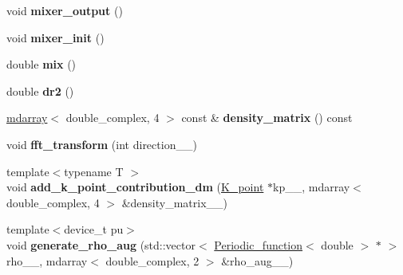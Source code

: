\begin{DoxyCompactItemize}
\item 
\hypertarget{classsirius_1_1_density_aa98f530b6ca5ce2cff733bffb22d589d}{}void {\bfseries mixer\+\_\+output} ()\label{classsirius_1_1_density_aa98f530b6ca5ce2cff733bffb22d589d}

\item 
\hypertarget{classsirius_1_1_density_a3571e02abf5a8bed85dd5d1afa355106}{}void {\bfseries mixer\+\_\+init} ()\label{classsirius_1_1_density_a3571e02abf5a8bed85dd5d1afa355106}

\item 
\hypertarget{classsirius_1_1_density_a856614b00a6343e0d977e2b4e449f07f}{}double {\bfseries mix} ()\label{classsirius_1_1_density_a856614b00a6343e0d977e2b4e449f07f}

\item 
\hypertarget{classsirius_1_1_density_aa148a0b62dc9649f7da79fb4ef361f99}{}double {\bfseries dr2} ()\label{classsirius_1_1_density_aa148a0b62dc9649f7da79fb4ef361f99}

\item 
\hypertarget{classsirius_1_1_density_a7f90caac4b64f48dd126605b0034b0df}{}\hyperlink{classsddk_1_1mdarray}{mdarray}$<$ double\+\_\+complex, 4 $>$ const \& {\bfseries density\+\_\+matrix} () const \label{classsirius_1_1_density_a7f90caac4b64f48dd126605b0034b0df}

\item 
\hypertarget{classsirius_1_1_density_a7d390abb5be73da91637dde8d0f2e550}{}void {\bfseries fft\+\_\+transform} (int direction\+\_\+\+\_\+)\label{classsirius_1_1_density_a7d390abb5be73da91637dde8d0f2e550}

\item 
\hypertarget{classsirius_1_1_density_a196bae7e30dffa1e83db9976ef8e0109}{}{\footnotesize template$<$typename T $>$ }\\void {\bfseries add\+\_\+k\+\_\+point\+\_\+contribution\+\_\+dm} (\hyperlink{classsirius_1_1_k__point}{K\+\_\+point} $\ast$kp\+\_\+\+\_\+, mdarray$<$ double\+\_\+complex, 4 $>$ \&density\+\_\+matrix\+\_\+\+\_\+)\label{classsirius_1_1_density_a196bae7e30dffa1e83db9976ef8e0109}

\item 
\hypertarget{classsirius_1_1_density_a4b9e362da740a726f5772f85c273345d}{}{\footnotesize template$<$device\+\_\+t pu$>$ }\\void {\bfseries generate\+\_\+rho\+\_\+aug} (std\+::vector$<$ \hyperlink{classsirius_1_1_periodic__function}{Periodic\+\_\+function}$<$ double $>$ $\ast$ $>$ rho\+\_\+\+\_\+, mdarray$<$ double\+\_\+complex, 2 $>$ \&rho\+\_\+aug\+\_\+\+\_\+)\label{classsirius_1_1_density_a4b9e362da740a726f5772f85c273345d}

\end{DoxyCompactItemize}
